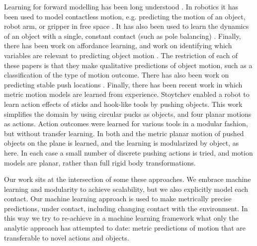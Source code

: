 Learning for forward modelling has been long understood \citep{JordanJacobs90, JordanRumelhart92}. In robotics it has been used to model contactless motion, e.g. predicting the motion of an object, robot arm, or gripper in free space \citep{Ting06,Boots14,dearden2005learning}. It has also been used to learn the dynamics of an object with a single, constant contact (such as pole balancing) \citep{Schaal97,SchaalAtkeson97}. Finally, there has been work on affordance learning, and work on identifying which variables are relevant to predicting object motion \citep{montesano08,moldovan12,hermans11,fitzpatrick_learning_2003,ridge2010self,kroemer2014}. The restriction of each of these papers is that they make qualitative predictions of object motion, such as a classification of the type of motion outcome. There has also been work on predicting stable push locations \citep{hermans13}. Finally, there has been recent work in which metric motion models are learned from experience. Stoytchev \citep{Stoytchev_affordances_2008} enabled a robot to learn action effects of sticks and hook-like tools by pushing objects. This work simplifies the domain by using circular pucks as objects, and four planar motions as actions. Action outcomes were learned for various tools in a modular fashion, but without transfer learning.  In both \citep{mericli2014} and \cite{scholz2010combining} the metric planar motion of pushed objects on the plane is learned, and the learning is modularized by object, as here. In each case a small number of discrete pushing actions is tried, and motion models are planar, rather than full rigid body transformations.

Our work sits at the intersection of some these approaches. We embrace machine learning and modularity to achieve scalability, but we also explicitly model each contact. Our machine learning approach is used to make metrically precise predictions, under contact, including changing contact with the environment. In this way we try to re-achieve in a machine learning framework what only the analytic approach has attempted to date: metric predictions of motion that are transferable to novel actions and objects. 